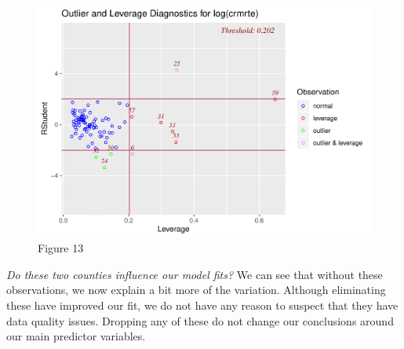 \documentclass[]{article}
\begin{document}
\begin{figure}

{\centering \includegraphics{lab_3_v7_files/figure-latex/unnamed-chunk-40-1} 

}

\caption{Figure 13}\label{fig:unnamed-chunk-40}
\end{figure}

\emph{Do these two counties influence our model fits?} We can see that
without these observations, we now explain a bit more of the variation.
Although eliminating these have improved our fit, we do not have any
reason to suspect that they have data quality issues. Dropping any of
these do not change our conclusions around our main predictor variables.
\end{document}
